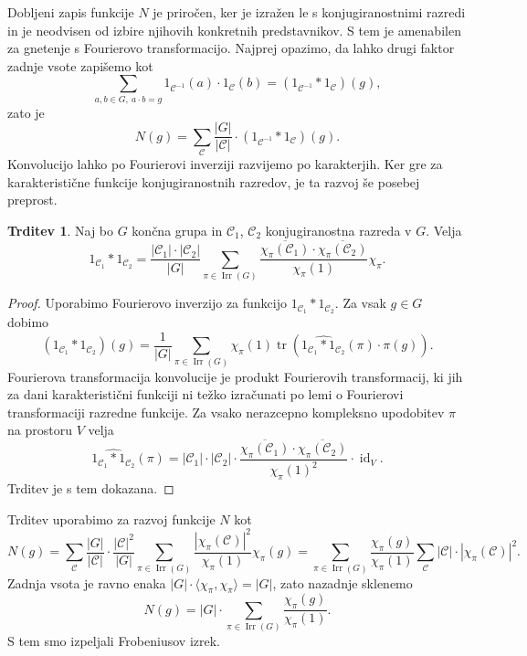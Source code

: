 \documentclass[11pt]{book}
\def\conclass{\mathcal{C}}
\DeclareMathOperator\tr{tr}
\DeclareMathOperator\Irr{Irr}
\DeclareMathOperator\id{id}
\theoremstyle{definition}
\theoremstyle{zgled}
\theoremstyle{odprtproblem}
\theoremstyle{domacanaloga}
\newenvironment{dokaz}
    {\color{siva}\begin{proof}}
    {\end{proof}}
\theoremstyle{izrek}
\newtheorem*{trditev}{Trditev}
\begin{document}
Dobljeni zapis funkcije $N$ je priročen, ker je izražen le s konjugiranostnimi razredi in je neodvisen od izbire njihovih konkretnih predstavnikov. S tem je amenabilen za gnetenje s Fourierovo transformacijo. Najprej opazimo, da lahko drugi faktor zadnje vsote zapišemo kot
\[
    \sum_{a,b \in G, \ a \cdot b = g} 1_{\conclass^{-1}}(a) \cdot 1_{\conclass}(b) = \left( 1_{\conclass^{-1}} * 1_{\conclass} \right) (g),
\]
zato je
\[
    N(g) = \sum_{\conclass} \frac{|G|}{|\conclass|} \cdot \left( 1_{\conclass^{-1}} * 1_{\conclass} \right) (g).
\]
Konvolucijo lahko po Fourierovi inverziji razvijemo po karakterjih. Ker gre za karakteristične funkcije konjugiranostnih razredov, je ta razvoj še posebej preprost.

\begin{trditev}
Naj bo $G$ končna grupa in $\conclass_1$, $\conclass_2$ konjugiranostna razreda v $G$. Velja
    \[
        1_{\conclass_1} * 1_{\conclass_2} = \frac{|\conclass_1| \cdot |\conclass_2|}{|G|} \sum_{\pi \in \Irr(G)} \frac{\overline{\chi_{\pi}(\conclass_1)} \cdot \overline{\chi_{\pi}(\conclass_2)}}{\chi_{\pi}(1)} \chi_{\pi}.
    \]
\end{trditev}
\begin{dokaz}
    Uporabimo Fourierovo inverzijo za funkcijo $1_{\conclass_1} * 1_{\conclass_2}$. Za vsak $g \in G$ dobimo
    \[
        \left( 1_{\conclass_1} * 1_{\conclass_2} \right) (g) 
        = \frac{1}{|G|} \sum_{\pi \in \Irr(G)} \chi_{\pi}(1) \tr \left( \widehat{1_{\conclass_1} * 1_{\conclass_2}}(\pi) \cdot \pi(g) \right).
    \]
    Fourierova transformacija konvolucije je produkt Fourierovih transformacij, ki jih za dani karakteristični funkciji ni težko izračunati po lemi o Fourierovi transformaciji razredne funkcije. Za vsako nerazcepno kompleksno upodobitev $\pi$ na prostoru $V$ velja
    \[
        \widehat{1_{\conclass_1} * 1_{\conclass_2}}(\pi) =
        |\conclass_1| \cdot |\conclass_2| \cdot \frac{\overline{\chi_{\pi}(\conclass_1)} \cdot \overline{\chi_{\pi}(\conclass_2)}}{\chi_{\pi}(1)^2} \cdot {\textstyle \id_V}.
    \]
    Trditev je s tem dokazana.
\end{dokaz}

Trditev uporabimo za razvoj funkcije $N$ kot
\[
    N(g) = \sum_{\conclass} \frac{|G|}{|\conclass|} \cdot \frac{|\conclass|^2}{|G|} \sum_{\pi \in \Irr(G)} \frac{|\chi_{\pi}(\conclass)|^2}{\chi_{\pi}(1)} \chi_{\pi}(g)
    = \sum_{\pi \in \Irr(G)} \frac{\chi_{\pi}(g)}{\chi_{\pi}(1)} \sum_{\conclass} |\conclass| \cdot |\chi_{\pi}(\conclass)|^2.
\]
Zadnja vsota je ravno enaka $|G| \cdot \langle \chi_{\pi}, \chi_{\pi} \rangle = |G|$, zato nazadnje sklenemo
\[
    N(g) = |G| \cdot \sum_{\pi \in \Irr(G)} \frac{\chi_{\pi}(g)}{\chi_{\pi}(1)}.
\]
S tem smo izpeljali Frobeniusov izrek.
\end{document}
